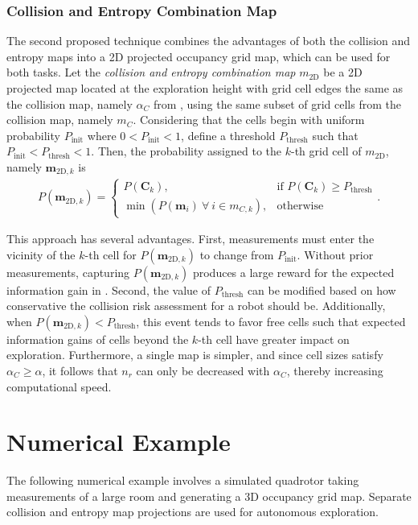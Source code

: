 \subsubsection{Collision and Entropy Combination Map}
The second proposed technique combines the advantages of both the collision and entropy maps into a 2D projected occupancy grid map, which can be used for both tasks. Let the \emph{collision and entropy combination map} $ m_\text{2D}$ be a 2D projected map located at the exploration height with grid cell edges the same as the collision map, namely $\alpha_C$ from , using the same subset of grid cells from the collision map, namely $ m_C$. Considering that the cells begin with uniform probability $P_\text{init}$ where $0<P_\text{init}<1$, define a threshold $P_\text{thresh}$ such that $P_\text{init}<P_\text{thresh}<1$. Then, the probability assigned to the $k$-th grid cell of $ m_\text{2D}$, namely $\mathbf{m}_{\text{2D},k}$ is
\begin{align}
P(\mathbf{m}_{\text{2D},k})= 
\begin{cases}
    P(\mathbf{C}_k),			& \text{if }P(\mathbf{C}_k)\geq P_\text{thresh}\\
    \min{(P(\mathbf{m}_i)\ \forall \ i\in m_{C,k})},              & \text{otherwise}
\end{cases}.
\end{align}

This approach has several advantages. First, measurements must enter the vicinity of the $k$-th cell for $P(\mathbf{m}_{\text{2D},k})$ to change from $P_\text{init}$. Without prior measurements, capturing $P(\mathbf{m}_{\text{2D},k})$ produces a large reward for the expected information gain in . Second, the value of $P_\text{thresh}$ can be modified based on how conservative the collision risk assessment for a robot should be. Additionally, when $P(\mathbf{m}_{\text{2D},k})<P_\text{thresh}$, this event tends to favor free cells such that expected information gains of cells beyond the $k$-th cell have greater impact on exploration. Furthermore, a single map is simpler, and since cell sizes satisfy $\alpha_C\geq\alpha$, it follows that $n_r$ can only be decreased with $\alpha_C$, thereby increasing computational speed.

\section{Numerical Example}

The following numerical example involves a simulated quadrotor taking measurements of a large room and generating a 3D occupancy grid map. Separate collision and entropy map projections are used for autonomous exploration.

